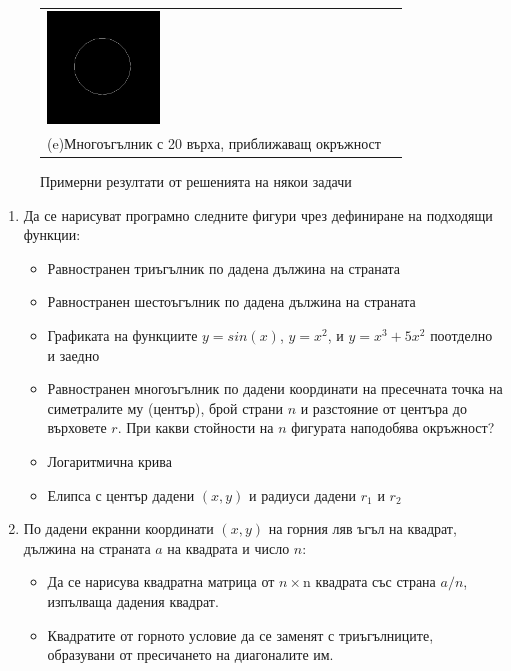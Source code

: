 {\begin{figure}
\begin{center}
\begin{tabular}{|p{5.2cm}p{5.2cm}|}
   \vspace{10pt}
   \includegraphics[width=3cm]{images/graph_twentygon}   &
    \\
    (e)Многоъгълник с 20 върха, приближаващ окръжност
   \vspace{10pt} &
   \\\hline
  \end{tabular}
  \end{center}

  \caption{Примерни резултати от решенията на някои задачи}
  \label{fig:drawings}
\end{figure}



\begin{enumerate}[resume]


	\item Да се нарисуват програмно следните фигури чрез дефиниране на подходящи функции:

	\begin{itemize}
		\item Равностранен триъгълник по дадена дължина на страната
		\item Равностранен шестоъгълник по дадена дължина на страната
		\item Графиката на функциите $y=sin(x)$, $y=x^2$, и $y=x^3+5x^2$ поотделно и заедно
    \item Равностранен многоъгълник по дадени координати на пресечната точка на симетралите му (център), брой страни $n$ и разстояние от центъра до върховете $r$. При какви стойности на $n$ фигурата наподобява окръжност?
		\item Логаритмична крива
		\item Елипса с център дадени $(x,y)$ и радиуси дадени $r_1$ и $r_2$
	\end{itemize}

	\item По дадени екранни координати $(x,y)$ на горния ляв ъгъл на квадрат, дължина на страната $a$ на квадрата и число $n$:

	\begin{itemize}
		\item Да се нарисува квадратна матрица от $n \times $n квадрата със страна $a/n$, изпълваща дадения квадрат.
		\item Квадратите от горното условие да се заменят с триъгълниците, образувани от пресичането на диагоналите им.
	\end{itemize}





\end{enumerate}}
